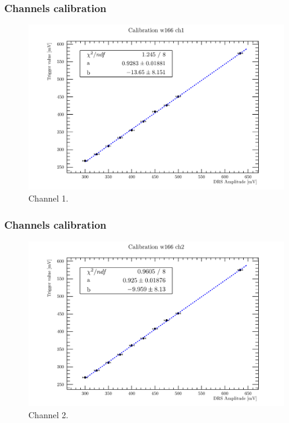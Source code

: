 \documentclass[9pt]{beamer}
\begin{document}
\begin{frame} [fragile]
\small
	\frametitle{Channels calibration}
    		\begin{figure}
		 \centering
			\includegraphics[scale=0.5]{figures/ch1.pdf}
			\caption{Channel 1.}
		\end{figure}  
\end{frame}


\begin{frame} [fragile]
\small
	\frametitle{Channels calibration}
    		\begin{figure}
		 \centering
			\includegraphics[scale=0.5]{figures/ch2.pdf}
			\caption{Channel 2.}
		\end{figure}  
\end{frame}
\end{document}
